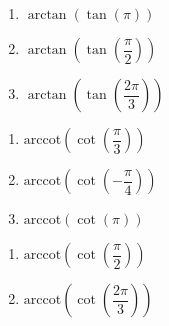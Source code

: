 \begin{multicols}{3}

\begin{enumerate}

\setcounter{enumi}{\value{HW}}

\item  $\arctan\left(\tan\left(\pi\right) \right)$  
\item  $\arctan\left(\tan\left(\dfrac{\pi}{2}\right) \right)$  
\item  $\arctan\left(\tan\left(\dfrac{2\pi}{3}\right) \right)$

\setcounter{HW}{\value{enumi}}

\end{enumerate}

\end{multicols}

\begin{multicols}{3}

\begin{enumerate}

\setcounter{enumi}{\value{HW}}

\item  $\text{arccot}\left(\cot\left(\dfrac{\pi}{3}\right) \right)$ 
\item  $\text{arccot}\left(\cot\left(-\dfrac{\pi}{4}\right) \right)$
\item  $\text{arccot}\left(\cot\left(\pi\right) \right)$  

\setcounter{HW}{\value{enumi}}

\end{enumerate}

\end{multicols}

\begin{multicols}{3}

\begin{enumerate}

\setcounter{enumi}{\value{HW}}

\item  $\text{arccot}\left(\cot\left(\dfrac{\pi}{2}\right) \right)$  
\item  $\text{arccot}\left(\cot\left(\dfrac{2\pi}{3}\right) \right)$ \label{morecomboexactlast}

\setcounter{HW}{\value{enumi}}

\end{enumerate}

\end{multicols}

